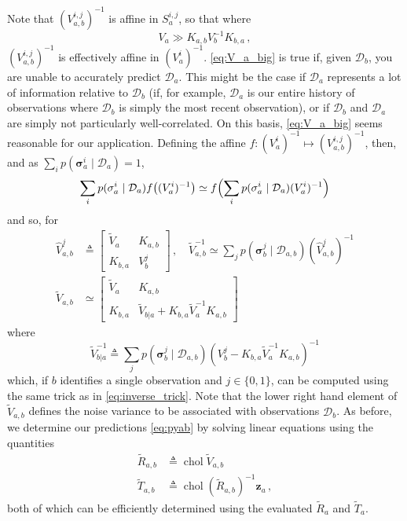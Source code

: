 \documentclass{article}
\newcommand{\given}{\ensuremath{\mid}}
\newcommand{\cm}[1]{\ensuremath{\mathcal{#1}}}
\newcommand{\bm}[1]{\ensuremath{\mathbf{#1}}}
\newcommand{\data}{\ensuremath{\cm{D}}}
\newcommand{\vect}[1]{\bm{#1}}
\newcommand{\vz}{\vect{z}}
\newcommand{\vs}{\vect{\sigma}}
\newcommand{\fPr}{p}
\newcommand{\Prob}[2]{\fPr(#1 \given #2 )}
\newcommand{\defequal}{\triangleq}
\DeclareMathOperator{\chol}{chol}
\begin{document}
Note that $({V}^{i,j}_{a,b})^{-1}$ is affine in $S^{i,j}_a$, so that where
\begin{equation}\label{eq:V_a_big}
 V_a \gg K_{a,b} V_b^{-1} K_{b,a}\,,
\end{equation}
$({V}^{i,j}_{a,b})^{-1}$ is effectively affine in
$(V^i_a)^{-1}$. \eqref{eq:V_a_big} is true if, given $\data_b$, you
are unable to accurately predict $\data_a$. This might be the case if
$\data_a$ represents a lot of information relative to $\data_b$ (if,
for example, $\data_a$ is our entire history of observations where
$\data_b$ is simply the most recent observation), or if $\data_b$ and
$\data_a$ are simply not particularly well-correlated. On this basis,
\eqref{eq:V_a_big} seems reasonable for our application. Defining the
affine $f: (V^i_a)^{-1} \mapsto ({V}^{i,j}_{a,b})^{-1}$, then, and as
$\sum_i \Prob{\vs^i_{a}}{\data_{a}} = 1$,
$$
\sum_i \Prob{\vs^i_{a}}{\data_{a}} f\bigl((V^i_a)^{-1} \bigr) \simeq f\Bigl(\sum_i \Prob{\vs^i_{a}}{\data_{a}}(V^i_a)^{-1} \Bigr)
$$
and so, for
\begin{align*}
\hat{V}^{j}_{a,b} & \defequal
\begin{bmatrix}
 \tilde{V}_a & K_{a,b}\\
 K_{b,a} & V^j_b
\end{bmatrix}
\,,
\quad
 \tilde{V}^{-1}_{a,b} \simeq \sum_j \Prob{\vs^j_{b}}{\data_{a,b}} (\hat{V}^{j}_{a,b})^{-1}
\nonumber\\
 \tilde{V}_{a,b} & \simeq
\begin{bmatrix}
 \tilde{V}_a & K_{a,b}\\
 K_{b,a} & \tilde{V}_{b|a} + K_{b,a} \tilde{V}_a^{-1} K_{a,b}
\end{bmatrix}
\end{align*}
where
\begin{equation*}
 \tilde{V}^{-1}_{b|a} \defequal \sum_j \Prob{\vs^j_{b}}{\data_{a,b}} (V^j_b -K_{b,a} \tilde{V}_a^{-1}K_{a,b})^{-1}
\end{equation*}
which, if $b$ identifies a single observation and $j\in\{0,1\}$, can
be computed using the same trick as in \eqref{eq:inverse_trick}. Note
that the lower right hand element of $\tilde{V}_{a,b}$ defines the
noise variance to be associated with observations $\data_b$. As
before, we determine our predictions \eqref{eq:pyab} by solving linear
equations using the quantities
\begin{align}
 \tilde{R}_{a,b} & \defequal \chol \tilde{V}_{a,b} \label{eq:Rab} \\
 \tilde{T}_{a,b} & \defequal \chol (\tilde{R}_{a,b})^{-1} \vz_a \label{eq:Tab} \,,
\end{align}
both of which can be efficiently determined \citep[Appendix
  B]{osbornebayesian} using the evaluated $\tilde{R}_a$ and
$\tilde{T}_a$.
\end{document}
